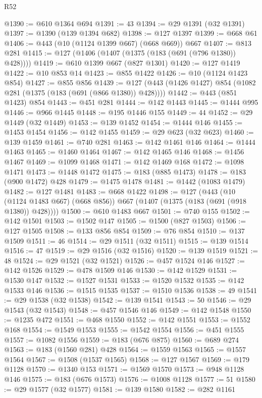 \begin{lexlean}{R52}
\begin{coremodule}
@1390 := @610 @1364 @694
@1391 := 43
@1394 := @29 @1391 (@32 @1391)
@1397 := @1390 (@139 @1394 @682)
@1398 := @127 @1397
@1399 := @668 @61
@1406 := @443 (@10 (@1124 @1399 @667) (@668 @669)) @667
@1407 := @813 @281
@1415 := @127 (@1406 (@1407 (@1375 (@183 (@691 (@796 @1380)) @428))))
@1419 := @610 @1399 @667 (@827 @1301)
@1420 := @127 @1419
@1422 := @10 @853 @14
@1423 := @855 @1422
@1426 := @10 (@1124 @1423 @854)
@1427 := @855 @856
@1439 := @127 (@443 (@1426 @1427) @854 (@1082 @281 (@1375 (@183 (@691 (@866 @1380)) @428))))
@1442 := @443 (@851 @1423) @854
@1443 := @451 @281
@1444 := @142 @1443
@1445 := @1444 @995
@1446 := @966 @1445
@1448 := @195 @1446 @155
@1449 := 44
@1452 := @29 @1449 (@32 @1449)
@1453 := @139 @1452
@1454 := @1444 @146
@1455 := @1453 @1454
@1456 := @142 @1455
@1459 := @29 @623 (@32 @623)
@1460 := @139 @1459
@1461 := @740 @281
@1463 := @142 @1461 @146
@1464 := @1444 @1463
@1465 := @1460 @1464
@1467 := @142 @1465 @146
@1468 := @1456 @1467
@1469 := @1099 @1468
@1471 := @142 @1469 @168
@1472 := @1098 @1471
@1473 := @1448 @1472
@1475 := @183 (@885 @1473)
@1478 := @183 (@900 @1472) @428
@1479 := @1475 @1478
@1481 := @1442 (@1083 @1479)
@1482 := @127 @1481
@1483 := @668 @1422
@1498 := @127
    (@443 (@10 (@1124 @1483 @667) (@668 @856)) @667 (@1407 (@1375 (@183 (@691 (@918 @1380)) @428))))
@1500 := @610 @1483 @667
@1501 := @740 @155
@1502 := @142 @1501
@1503 := @1502 @147
@1505 := @1500 (@827 @1503)
@1506 := @127 @1505
@1508 := @133 @856 @854
@1509 := @76 @854
@1510 := @137 @1509
@1511 := 46
@1514 := @29 @1511 (@32 @1511)
@1515 := @139 @1514
@1516 := 47
@1519 := @29 @1516 (@32 @1516)
@1520 := @139 @1519
@1521 := 48
@1524 := @29 @1521 (@32 @1521)
@1526 := @457 @1524 @146
@1527 := @142 @1526
@1529 := @478 @1509 @146
@1530 := @142 @1529
@1531 := @1530 @147
@1532 := @1527 @1531
@1533 := @1520 @1532
@1535 := @142 @1533 @146
@1536 := @1515 @1535
@1537 := @1510 @1536
@1538 := 49
@1541 := @29 @1538 (@32 @1538)
@1542 := @139 @1541
@1543 := 50
@1546 := @29 @1543 (@32 @1543)
@1548 := @457 @1546 @146
@1549 := @142 @1548
@1550 := @1235 @472
@1551 := @468 @1550
@1552 := @142 @1551
@1553 := @1552 @168
@1554 := @1549 @1553
@1555 := @1542 @1554
@1556 := @451 @1555
@1557 := @1082 @1556
@1559 := @183 (@676 @875)
@1560 := @689 @274
@1563 := @183 (@1560 @281) @428
@1564 := @1559 @1563
@1565 := @1557 @1564
@1567 := @1508 (@1537 @1565)
@1568 := @127 @1567
@1569 := @179 @1128
@1570 := @1340 @153
@1571 := @1569 @1570
@1573 := @948 @1128 @146
@1575 := @183 (@676 @1573)
@1576 := @1008 @1128
@1577 := 51
@1580 := @29 @1577 (@32 @1577)
@1581 := @139 @1580
@1582 := @282 @1161

\end{coremodule}
\end{lexlean}
